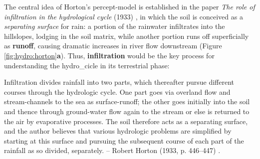 \documentclass[./main_en.tex]{subfiles}
\begin{document}
\par The central idea of Horton’s \gls{percept-model} is established in the paper \textit{The role of infiltration in the hydrological cycle} (1933) \cite{Horton1933}, in which the soil is conceived as a \textit{separating surface} for rain: a portion of the rainwater infiltrates into the hillslopes, lodging in the soil matrix, while another portion runs off superficially as \textbf{runoff}, causing dramatic increases in river flow downstream (Figure \ref{fig:hydro:horton}\textbf{a}). Thus, \textbf{\gls{infiltration}} would be the key process for understanding the \gls{hydro_cicle} in its terrestrial phase:

\begin{adjustwidth}{100pt}{0pt}
\medskip
\small Infiltration divides rainfall into two parts, which thereafter pursue different courses through the hydrologic cycle. One part goes via overland flow and stream-channels to the sea as surface-runoff; the other goes initially into the soil and thence through ground-water flow again to the stream or else is returned to the air by evaporative processes. The soil therefore acts as a separating surface, and the author believes that various hydrologic problems are simplified by starting at this surface and pursuing the subsequent course of each part of the rainfall as so divided, separately. -- Robert Horton (1933, p. 446–447) \cite{Horton1933}. 
\medskip
\end{adjustwidth}
\end{document}
